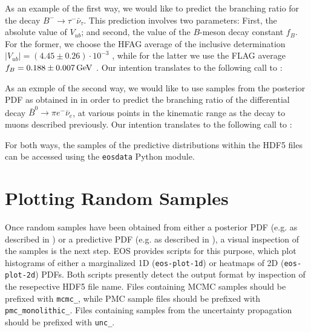 As an example of the first way, we would like to predict the branching
ratio for the decay $B^- \to \tau^- \bar{\nu}_\tau$. This prediction involves
two parameters: First, the absolute value of $V_{ub}$; and second, the value
of the $B$-meson decay constant $f_{B}$. For the former, we choose the
HFAG average of the inclusive determination $|V_{ub}| = (4.45 \pm 0.26) \cdot 10^{-3}$
\cite{Amhis:2014hma}, while for the latter we use the FLAG average
$f_{B} = 0.188 \pm 0.007\,\mathrm{GeV}$ \cite{Aoki:2013ldr}.
Our intention translates to the following call to :

As an exmple of the second way, we would like to use samples from the posterior
PDF as obtained in  in order to predict the
branching ratio of the differential decay $\bar{B}^0\to \pi e^- \bar{\nu}_e$, at various
points in the kinematic range as the decay to muons described previously.
Our intention translates to the following call to :

For both ways, the samples of the predictive distributions within the HDF5 files
can be accessed using the \texttt{eosdata} Python module.

\section{Plotting Random Samples}
\label{sec:usage:eos-plot}

Once random samples have been obtained from either a posterior PDF (e.g. as
described in ) or a predictive PDF (e.g. as
described in ), a visual inspection of
the samples is the next step.  EOS provides scripts for this purpose, which
plot histograms of either a marginalized 1D (\texttt{eos-plot-1d}) or heatmaps
of 2D (\texttt{eos-plot-2d}) PDFs.  Both scripts presently detect the output
format by inspection of the resepective HDF5 file name. Files containing MCMC
samples should be prefixed with \texttt{mcmc\_}, while PMC sample files should
be prefixed with \texttt{pmc\_monolithic\_}. Files containing samples from the
uncertainty propagation should be prefixed with \texttt{unc\_}.

